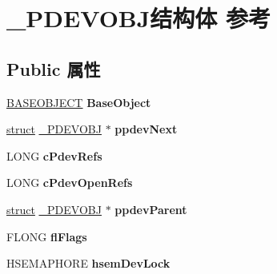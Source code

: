\hypertarget{struct___p_d_e_v_o_b_j}{}\section{\+\_\+\+P\+D\+E\+V\+O\+B\+J结构体 参考}
\label{struct___p_d_e_v_o_b_j}
\subsection*{Public 属性}
\begin{DoxyCompactItemize}
\item 
\mbox{\label{struct___p_d_e_v_o_b_j_a0cd3af75578ca920839d948c91460bcc}} 
\hyperlink{class_b_a_s_e_o_b_j_e_c_t}{B\+A\+S\+E\+O\+B\+J\+E\+CT} {\bfseries Base\+Object}
\item 
\mbox{\label{struct___p_d_e_v_o_b_j_a0a9800fd6d5f6f5816f0ca94d0f5b73b}} 
\hyperlink{interfacestruct}{struct} \hyperlink{struct___p_d_e_v_o_b_j}{\+\_\+\+P\+D\+E\+V\+O\+BJ} $\ast$ {\bfseries ppdev\+Next}
\item 
\mbox{\label{struct___p_d_e_v_o_b_j_ab76c34551655204cbf9834b5f77dd295}} 
L\+O\+NG {\bfseries c\+Pdev\+Refs}
\item 
\mbox{\label{struct___p_d_e_v_o_b_j_a02f0474137cd7c35cc3143fab12ea5b8}} 
L\+O\+NG {\bfseries c\+Pdev\+Open\+Refs}
\item 
\mbox{\label{struct___p_d_e_v_o_b_j_a04fada7fe315e84e5bc0722cc0e31ad2}} 
\hyperlink{interfacestruct}{struct} \hyperlink{struct___p_d_e_v_o_b_j}{\+\_\+\+P\+D\+E\+V\+O\+BJ} $\ast$ {\bfseries ppdev\+Parent}
\item 
\mbox{\label{struct___p_d_e_v_o_b_j_a4ab392341298c71fd843626b4d93f039}} 
F\+L\+O\+NG {\bfseries fl\+Flags}
\item 
\mbox{\label{struct___p_d_e_v_o_b_j_ae79f3a38b614f28ee0b1cbad28063000}} 
H\+S\+E\+M\+A\+P\+H\+O\+RE {\bfseries hsem\+Dev\+Lock}
\item 
\mbox{\label{struct___p_d_e_v_o_b_j_a060bd5a25463465a33d6ad2119263b4e}} 

\end{DoxyCompactItemize}
